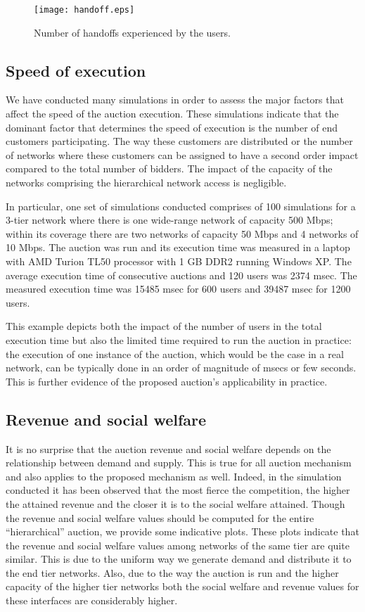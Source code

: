\documentclass[a4paper]{article}
\begin{document}
\begin{figure}[htbp]
	\centering\texttt{[image: handoff.eps]}
	\caption{Number of handoffs experienced by the users.}
	\label{fig:handoff}
\end{figure}

\subsection{Speed of execution}

We have conducted many simulations in order to assess the major factors 
that affect the speed of the auction execution. These simulations indicate
that the dominant factor that determines the speed of execution is the number
of end customers participating. The way these customers are distributed or the
number of networks where these customers can be assigned to have a second order
impact compared to the total number of bidders. The impact of the capacity of
the networks comprising the hierarchical network access is negligible.

In particular, one set of simulations conducted comprises of 100 simulations 
for a 3-tier network where
there is one wide-range network of capacity 500 Mbps; within its coverage
there are two networks of capacity 50 Mbps and 4 networks of 10 Mbps.
The auction was run and its execution time was measured in a laptop with 
AMD Turion TL50 processor with 1 GB DDR2 running Windows XP. The average
execution time of  consecutive auctions and 120 users was 2374 msec. 
The measured execution time was 15485 msec for 600 users and 39487 msec 
for 1200 users. 

This example depicts both the impact of the number
of users in the total execution time but also the limited time required to
run the auction in practice: the execution of one instance of the auction,
which would be the case in a real network, can be typically done in an order
of magnitude of msecs or few seconds. This is further evidence of the proposed
auction's applicability in practice.


\subsection{Revenue and social welfare}

It is no surprise that the auction revenue and social welfare depends on 
the relationship between demand and supply. This is true for all auction
mechanism and also applies to the proposed mechanism as well. Indeed, 
in the simulation conducted it has been observed that the most fierce the 
competition, the higher the attained revenue and the closer it is to the
social welfare attained. Though the revenue and social welfare values should
be computed for the entire ``hierarchical'' auction, we provide some indicative
plots. These plots indicate that the revenue and social welfare values among 
networks of the same tier are quite similar. This is due to the uniform way 
we generate demand and distribute it to the end tier networks. Also, due to
the way the auction is run and the higher capacity of the higher tier networks
both the social welfare and revenue values for these interfaces are considerably
higher. 
\end{document}
